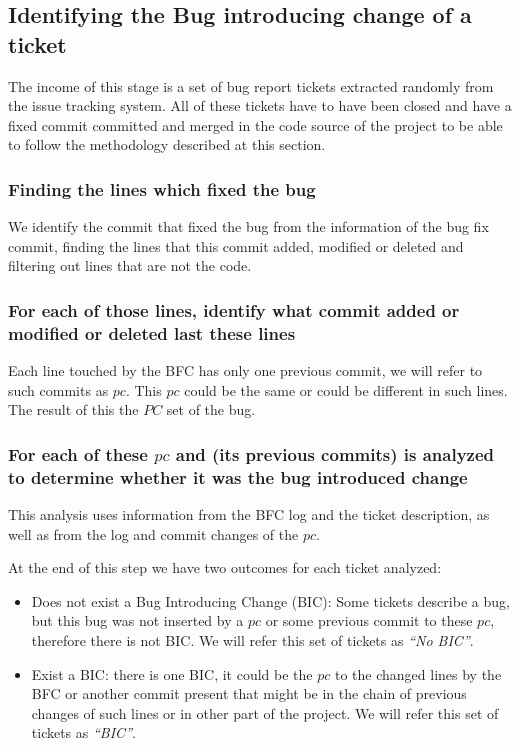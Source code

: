 \documentclass[conference]{IEEEtran}
\begin{document}
\subsection{Identifying the Bug introducing change of a ticket}
\label{sec:methodologySS}
The income of this stage is a set of bug report tickets extracted randomly from the issue tracking system. All of these tickets have to have been closed and have a fixed commit committed and merged in the code source of the project to be able to follow the methodology described at this section.

\subsubsection{Finding the lines which fixed the bug}
We identify the commit that fixed the bug from the information of the bug fix commit, finding the lines that this commit added, modified or deleted and filtering out lines that are not the code.
	
\subsubsection{For each of those lines, identify what commit added or modified or deleted last these lines}

Each line touched by the BFC has only one previous commit, we will refer to such commits as $pc$. This $pc$ could be the same or could be different in such lines. The result of this the $PC$ set of the bug.

\subsubsection{For each of these $pc$ and (its previous commits) is analyzed to determine whether it was the bug introduced change }

This analysis uses information from the BFC log and the ticket description, as well as from the log and commit changes of the $pc$.

At the end of this step we have two outcomes for each ticket analyzed:
\begin{itemize}
	\item Does not exist a Bug Introducing Change (BIC): Some tickets describe a bug, but this bug was not inserted by a $pc$ or some previous commit to these $pc$, therefore there is not BIC. We will refer this set of tickets as \textit{``No BIC''}.
	\item Exist a BIC: there is one BIC, it could be the $pc$ to the changed lines by the BFC or another commit present that might be in the chain of previous changes of such lines or in other part of the project. We will refer this set of tickets as \textit{``BIC''}. 
\end{itemize}
\end{document}
